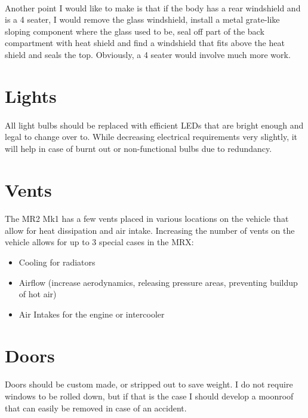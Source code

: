 \documentclass[a4paper,10pt]{report}
\begin{document}
\paragraph*{}Another point I would like to make is that if the body has a rear windshield and is a 4 seater, I would remove the glass windshield, install a metal grate-like sloping component where the glass used to be, seal off part of the back compartment with heat shield and find a windshield that fits above the heat shield and seals the top. Obviously, a 4 seater would involve much more work.



\section{Lights}
\paragraph*{}All light bulbs should be replaced with efficient LEDs that are bright enough and legal to change over to. While decreasing electrical requirements very slightly, it will help in case of burnt out or non-functional bulbs due to redundancy.

\section{Vents}
\paragraph*{}The MR2 Mk1 has a few vents placed in various locations on the vehicle that allow for heat dissipation and air intake. Increasing the number of vents on the vehicle allows for up to 3 special cases in the MRX:
\begin{itemize}
 \item Cooling for radiators
 \item Airflow (increase aerodynamics, releasing pressure areas, preventing buildup of hot air)
 \item Air Intakes for the engine or intercooler
\end{itemize}

\section{Doors}
\paragraph*{}Doors should be custom made, or stripped out to save weight. I do not require windows to be rolled down, but if that is the case I should develop a moonroof that can easily be removed in case of an accident.
\end{document}
